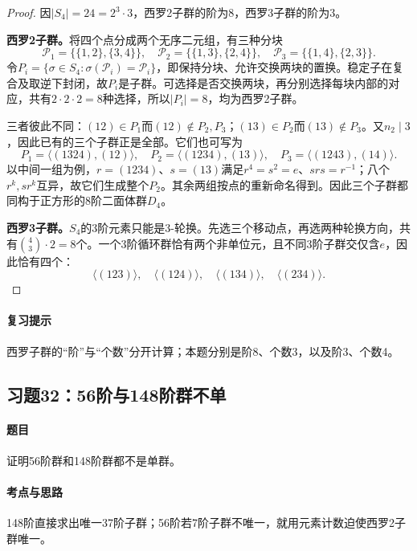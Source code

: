 \begin{proof}
因$|S_4|=24=2^3\cdot3$，西罗2子群的阶为8，西罗3子群的阶为3。

\textbf{西罗2子群。}将四个点分成两个无序二元组，有三种分块
\[
\mathcal P_1=\{\{1,2\},\{3,4\}\},\quad
\mathcal P_2=\{\{1,3\},\{2,4\}\},\quad
\mathcal P_3=\{\{1,4\},\{2,3\}\}.
\]
令$P_i=\{\sigma\in S_4:\sigma(\mathcal P_i)=\mathcal P_i\}$，即保持分块、允许交换两块的置换。稳定子在复合及取逆下封闭，故$P_i$是子群。可选择是否交换两块，再分别选择每块内部的对应，共有$2\cdot2\cdot2=8$种选择，所以$|P_i|=8$，均为西罗2子群。

三者彼此不同：$(12)\in P_1$而$(12)\notin P_2,P_3$；$(13)\in P_2$而$(13)\notin P_3$。又$n_2\mid3$，因此已有的三个子群正是全部。它们也可写为
\[
P_1=\langle(1324),(12)\rangle,\quad
P_2=\langle(1234),(13)\rangle,\quad
P_3=\langle(1243),(14)\rangle.
\]
以中间一组为例，$r=(1234)$、$s=(13)$满足$r^4=s^2=e$、$srs=r^{-1}$；八个$r^k,sr^k$互异，故它们生成整个$P_2$。其余两组按点的重新命名得到。因此三个子群都同构于正方形的8阶二面体群$D_4$。

\textbf{西罗3子群。}$S_4$的3阶元素只能是3-轮换。先选三个移动点，再选两种轮换方向，共有$\binom43\cdot2=8$个。一个3阶循环群恰有两个非单位元，且不同3阶子群交仅含$e$，因此恰有四个：
\[
\langle(123)\rangle,\quad\langle(124)\rangle,\quad
\langle(134)\rangle,\quad\langle(234)\rangle.
\]
\end{proof}

\paragraph{复习提示}
西罗子群的“阶”与“个数”分开计算；本题分别是阶8、个数3，以及阶3、个数4。


\subsection{习题32：\texorpdfstring{56阶与148阶群不单}{56阶与148阶群不单}}
\label{ex:2:32}

\paragraph{题目}
证明56阶群和148阶群都不是单群。

\paragraph{考点与思路}
148阶直接求出唯一37阶子群；56阶若7阶子群不唯一，就用元素计数迫使西罗2子群唯一。

